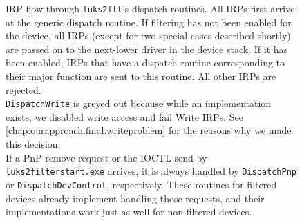 \begin{figure}
	\center
	\small
	\caption[
		IRP flow through \texttt{luks2flt}'s dispatch routines
	]{
		IRP flow through \texttt{luks2flt}'s dispatch routines. All IRPs first arrive at the generic dispatch routine. If filtering has not been enabled for the device, all IRPs (except for two special cases described shortly) are passed on to the next-lower driver in the device stack. If it has been enabled, IRPs that have a dispatch routine corresponding to their major function are sent to this routine. All other IRPs are rejected.\\
		\texttt{DispatchWrite} is greyed out because while an implementation exists, we disabled write access and fail Write IRPs. See \autoref{chap:ourapproach.final.writeproblem} for the reasons why we made this decision.\\
		If a PnP remove request or the IOCTL send by \texttt{luks2filterstart.exe} arrives, it is always handled by \texttt{DispatchPnp} or \texttt{DispatchDevControl}, respectively. These routines for filtered devices already implement handling those requests, and their implementations work just as well for non-filtered devices.
	}
	\label{fig:ourapproach.final.irpdispatch}
\end{figure}

